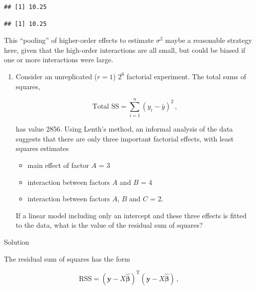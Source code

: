\documentclass[
]{book}
\newenvironment{Shaded}{\begin{snugshade}}{\end{snugshade}}
\newcommand{\DecValTok}[1]{\textcolor[rgb]{0.00,0.00,0.81}{#1}}
\newcommand{\FunctionTok}[1]{\textcolor[rgb]{0.00,0.00,0.00}{#1}}
\newcommand{\NormalTok}[1]{#1}
\newcommand{\SpecialCharTok}[1]{\textcolor[rgb]{0.00,0.00,0.00}{#1}}
\providecommand{\tightlist}{%
  \setlength{\itemsep}{0pt}\setlength{\parskip}{0pt}}
\theoremstyle{definition}
\theoremstyle{definition}
\theoremstyle{definition}
\theoremstyle{definition}
\theoremstyle{remark}
\begin{document}
\begin{verbatim}
## [1] 10.25
\end{verbatim}

\begin{Shaded}
\end{Shaded}

\begin{verbatim}
## [1] 10.25
\end{verbatim}

This ``pooling'' of higher-order effects to estimate \(\sigma^2\) maybe a reasonable strategy here, given that the high-order interactions are all small, but could be biased if one or more interactions were large.

\begin{enumerate}
\def\labelenumi{\arabic{enumi}.}
\setcounter{enumi}{1}
\item
  \citep[Adapted from][]{Morris2011} Consider an unreplicated (\(r=1\)) \(2^6\) factorial experiment. The total sums of squares,

  \[
  \mbox{Total SS} = \sum_{i=1}^n(y_i - \bar{y})^2\,,
  \]

  has value 2856. Using Lenth's method, an informal analysis of the data suggests that there are only three important factorial effects, with least squares estimates

  \begin{itemize}
  \tightlist
  \item
    main effect of factor \(A\) = 3
  \item
    interaction between factors \(A\) and \(B\) = 4
  \item
    interaction between factors \(A\), \(B\) and \(C\) = 2.
  \end{itemize}

  If a linear model including only an intercept and these three effects is fitted to the data, what is the value of the residual sum of squares?
\end{enumerate}

Solution

The residual sum of squares has the form

\[
\mbox{RSS} = (\boldsymbol{y}- X\hat
{\boldsymbol{\beta}})^{\mathrm{T}}(\boldsymbol{y}- X\hat
{\boldsymbol{\beta}})\,,  
\]
\end{document}
